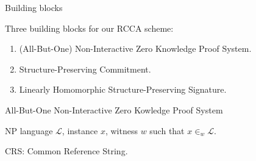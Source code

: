 
\begin{frame}{Building blocks}
  \begin{block}{Three building blocks for our RCCA scheme:}
    \begin{enumerate}
    \item (All-But-One) Non-Interactive Zero Knowledge Proof System.
    \item Structure-Preserving Commitment.
    \item Linearly Homomorphic Structure-Preserving Signature.
    \end{enumerate}
  \end{block}
\end{frame}



\begin{frame}{All-But-One Non-Interactive Zero Kowledge Proof System}

  NP language $\mathcal{L}$, instance $x$, witness $w$ such that $x \in_w \mathcal{L}$.

  \textsf{CRS}: Common Reference String.



  


\end{frame}
